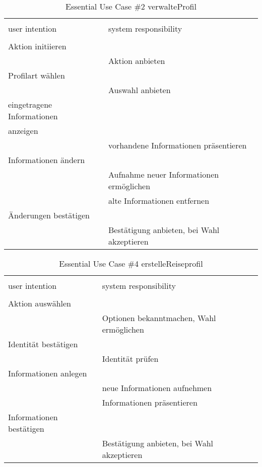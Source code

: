 \begin{table}[H]
\caption{Essential Use Case \#2 verwalteProfil }
\centering
\begin{tabular}{l l}
\\ [-0.5ex]

\hline\hline
\\ [-0.5ex]
user intention & system responsibility
\\ [1.5ex]
\hline
\\ [-0.5ex]
Aktion initiieren			& 											 \\[1ex]
							& Aktion anbieten							 \\[1ex]
Profilart wählen			& 											 \\[1ex]
							& Auswahl anbieten							 \\[1ex]							
eingetragene Informationen	& 											 \\[1ex]
anzeigen					& 											 \\[1ex]
							& vorhandene Informationen präsentieren      \\[1ex] 
Informationen ändern 		& 											 \\[1ex] 
							& Aufnahme neuer Informationen ermöglichen	 \\[1ex]
							& alte Informationen entfernen				 \\[1ex]
Änderungen bestätigen		& 											 \\[1ex]
							& Bestätigung anbieten, bei Wahl akzeptieren \\[1ex]
\hline
\end{tabular}
\label{tab:profilbearbeiten}
\end{table}



\begin{table}[H]
\caption{Essential Use Case \#4 erstelleReiseprofil }
\centering
\begin{tabular}{l l}
\\ [-0.5ex]

\hline\hline
\\ [-0.5ex]
user intention & system responsibility
\\ [1.5ex]
\hline
\\ [-0.5ex]
Aktion auswählen 			& 											 \\[1ex]
							& Optionen bekanntmachen, Wahl ermöglichen	 \\[1ex]
Identität bestätigen		& 											 \\[1ex]
							& Identität prüfen							 \\[1ex]
Informationen anlegen 		& 											 \\[1ex] 
							& neue Informationen aufnehmen				 \\[1ex]
							& Informationen präsentieren				 \\[1ex]
Informationen bestätigen	& 											 \\[1ex]
							& Bestätigung anbieten, bei Wahl akzeptieren \\[1ex]

\hline
\end{tabular}
\label{tab:mietauftrag}
\end{table}

